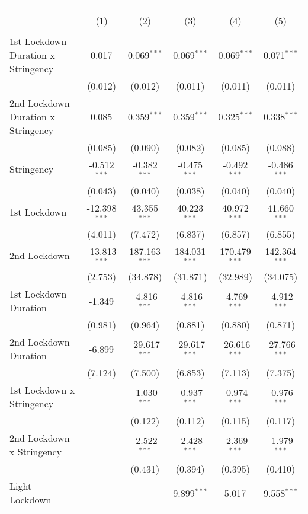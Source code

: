 \begin{tabular}{@{\extracolsep{5pt}}lccccc}
\\[-1.8ex]\hline
\hline \\[-1.8ex]
& \multicolumn{5}{c}{\textit{}} \
\cr \cline{5-6}
\\[-1.8ex] & (1) & (2) & (3) & (4) & (5) \\
\hline \\[-1.8ex]
 1st Lockdown Duration x Stringency & 0.017$^{}$ & 0.069$^{***}$ & 0.069$^{***}$ & 0.069$^{***}$ & 0.071$^{***}$ \\
  & (0.012) & (0.012) & (0.011) & (0.011) & (0.011) \\
 2nd Lockdown Duration x Stringency & 0.085$^{}$ & 0.359$^{***}$ & 0.359$^{***}$ & 0.325$^{***}$ & 0.338$^{***}$ \\
  & (0.085) & (0.090) & (0.082) & (0.085) & (0.088) \\
 Stringency & -0.512$^{***}$ & -0.382$^{***}$ & -0.475$^{***}$ & -0.492$^{***}$ & -0.486$^{***}$ \\
  & (0.043) & (0.040) & (0.038) & (0.040) & (0.040) \\
 1st Lockdown & -12.398$^{***}$ & 43.355$^{***}$ & 40.223$^{***}$ & 40.972$^{***}$ & 41.660$^{***}$ \\
  & (4.011) & (7.472) & (6.837) & (6.857) & (6.855) \\
 2nd Lockdown & -13.813$^{***}$ & 187.163$^{***}$ & 184.031$^{***}$ & 170.479$^{***}$ & 142.364$^{***}$ \\
  & (2.753) & (34.878) & (31.871) & (32.989) & (34.075) \\
 1st Lockdown Duration & -1.349$^{}$ & -4.816$^{***}$ & -4.816$^{***}$ & -4.769$^{***}$ & -4.912$^{***}$ \\
  & (0.981) & (0.964) & (0.881) & (0.880) & (0.871) \\
 2nd Lockdown Duration & -6.899$^{}$ & -29.617$^{***}$ & -29.617$^{***}$ & -26.616$^{***}$ & -27.766$^{***}$ \\
  & (7.124) & (7.500) & (6.853) & (7.113) & (7.375) \\
 1st Lockdown x Stringency & & -1.030$^{***}$ & -0.937$^{***}$ & -0.974$^{***}$ & -0.976$^{***}$ \\
  & & (0.122) & (0.112) & (0.115) & (0.117) \\
 2nd Lockdown x Stringency & & -2.522$^{***}$ & -2.428$^{***}$ & -2.369$^{***}$ & -1.979$^{***}$ \\
  & & (0.431) & (0.394) & (0.395) & (0.410) \\
 Light Lockdown & & & 9.899$^{***}$ & 5.017$^{}$ & 9.558$^{***}$ \\

\end{tabular}
